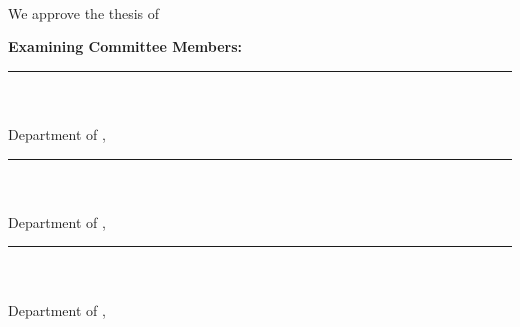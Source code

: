~\pagebreak

\thispagestyle{empty}

\begin{spacing}{1}
	\noindent We approve the thesis of
	\textbf{\AuthorName{ }\MakeUppercase\AuthorSurname}
	\vspace{0.5cm}

	\noindent\textbf{Examining Committee Members:}
	\vspace{0.5cm}

	\noindent\rule{5cm}{0.1mm}\\
	\textbf{\CommitteeMemberOneTitle{ }\CommitteeMemberOneName{ }
	\MakeUppercase\CommitteeMemberOneSurname}\\
	Department of \CommitteeMemberOneDepartment, \CommitteeMemberOneUniversity
	\vspace{0.5cm}

	\noindent\rule{5cm}{0.1mm}\\
	\textbf{\CommitteeMemberTwoTitle{ }\CommitteeMemberTwoName{ }
	\MakeUppercase\CommitteeMemberTwoSurname}\\
	Department of \CommitteeMemberTwoDepartment, \CommitteeMemberTwoUniversity
	\vspace{0.5cm}

	\noindent\rule{5cm}{0.1mm}\\
	\textbf{\CommitteeMemberThreeTitle{ }\CommitteeMemberThreeName{ }
	\MakeUppercase\CommitteeMemberThreeSurname}\\
	Department of \CommitteeMemberThreeDepartment, \CommitteeMemberThreeUniversity
	\vspace{0.5cm}




\end{spacing}
